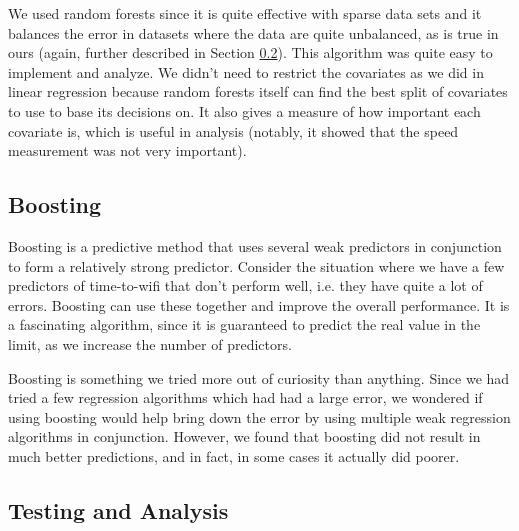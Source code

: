 \documentclass[12pt, fleqn]{article}
\begin{document}
We used random forests since it is quite effective with sparse data sets and it balances the error in datasets 
where the data are quite unbalanced, as is true in ours (again, further described in Section \ref{time-to-wifi-analysis}). 
This algorithm was quite easy to implement and analyze. We didn’t need to restrict the 
covariates as we did in linear regression because random forests itself can find the best split 
of covariates to use to base its decisions on. It also gives a measure of how important each 
covariate is, which is useful in analysis (notably, it showed that the speed measurement 
was not very important).

\subsection{Boosting}
\label{time-to-wifi-boosting}

Boosting is a predictive method that uses several weak predictors in conjunction 
to form a relatively strong predictor. Consider the situation where we have a 
few predictors of time-to-wifi that don't perform well, i.e. they have quite a 
lot of errors. Boosting can use these together and improve the overall 
performance. It is a fascinating algorithm, since it is guaranteed to predict the 
real value in the limit, as we increase the number of predictors. 

Boosting is something we tried more out of curiosity than anything. Since we 
had tried a few regression algorithms which had had a large error, we wondered if 
using boosting would help bring down the error by using multiple weak regression algorithms 
in conjunction. However, we found that boosting did not result in much 
better predictions, and in fact, in some cases it actually did poorer. 

\subsection{Testing and Analysis}
\label{time-to-wifi-analysis}
\end{document}
